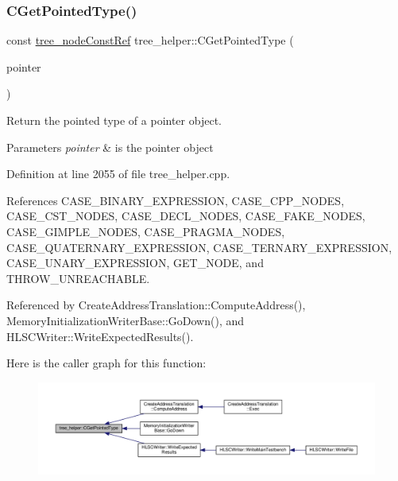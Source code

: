 \subsubsection{\texorpdfstring{C\+Get\+Pointed\+Type()}{CGetPointedType()}}
{\footnotesize\ttfamily const \hyperlink{tree__node_8hpp_a3cf5d02292c940f3892425a5b5fdec3c}{tree\+\_\+node\+Const\+Ref} tree\+\_\+helper\+::\+C\+Get\+Pointed\+Type (\begin{DoxyParamCaption}\item[{const \hyperlink{tree__node_8hpp_a3cf5d02292c940f3892425a5b5fdec3c}{tree\+\_\+node\+Const\+Ref}}]{pointer }\end{DoxyParamCaption})\hspace{0.3cm}{\ttfamily [static]}}



Return the pointed type of a pointer object. 


\begin{DoxyParams}{Parameters}
{\em pointer} & is the pointer object \\
\hline
\end{DoxyParams}


Definition at line 2055 of file tree\+\_\+helper.\+cpp.



References C\+A\+S\+E\+\_\+\+B\+I\+N\+A\+R\+Y\+\_\+\+E\+X\+P\+R\+E\+S\+S\+I\+ON, C\+A\+S\+E\+\_\+\+C\+P\+P\+\_\+\+N\+O\+D\+ES, C\+A\+S\+E\+\_\+\+C\+S\+T\+\_\+\+N\+O\+D\+ES, C\+A\+S\+E\+\_\+\+D\+E\+C\+L\+\_\+\+N\+O\+D\+ES, C\+A\+S\+E\+\_\+\+F\+A\+K\+E\+\_\+\+N\+O\+D\+ES, C\+A\+S\+E\+\_\+\+G\+I\+M\+P\+L\+E\+\_\+\+N\+O\+D\+ES, C\+A\+S\+E\+\_\+\+P\+R\+A\+G\+M\+A\+\_\+\+N\+O\+D\+ES, C\+A\+S\+E\+\_\+\+Q\+U\+A\+T\+E\+R\+N\+A\+R\+Y\+\_\+\+E\+X\+P\+R\+E\+S\+S\+I\+ON, C\+A\+S\+E\+\_\+\+T\+E\+R\+N\+A\+R\+Y\+\_\+\+E\+X\+P\+R\+E\+S\+S\+I\+ON, C\+A\+S\+E\+\_\+\+U\+N\+A\+R\+Y\+\_\+\+E\+X\+P\+R\+E\+S\+S\+I\+ON, G\+E\+T\+\_\+\+N\+O\+DE, and T\+H\+R\+O\+W\+\_\+\+U\+N\+R\+E\+A\+C\+H\+A\+B\+LE.



Referenced by Create\+Address\+Translation\+::\+Compute\+Address(), Memory\+Initialization\+Writer\+Base\+::\+Go\+Down(), and H\+L\+S\+C\+Writer\+::\+Write\+Expected\+Results().

Here is the caller graph for this function\+:
\nopagebreak
\begin{figure}[H]
\begin{center}
\leavevmode
\includegraphics[width=350pt]{d7/d99/classtree__helper_aa65ede36196d49543afb324151f71ed3_icgraph}
\end{center}
\end{figure}
\mbox{\label{classtree__helper_ab889be102080bfbbbb7cf7b69c3e932d}} 
